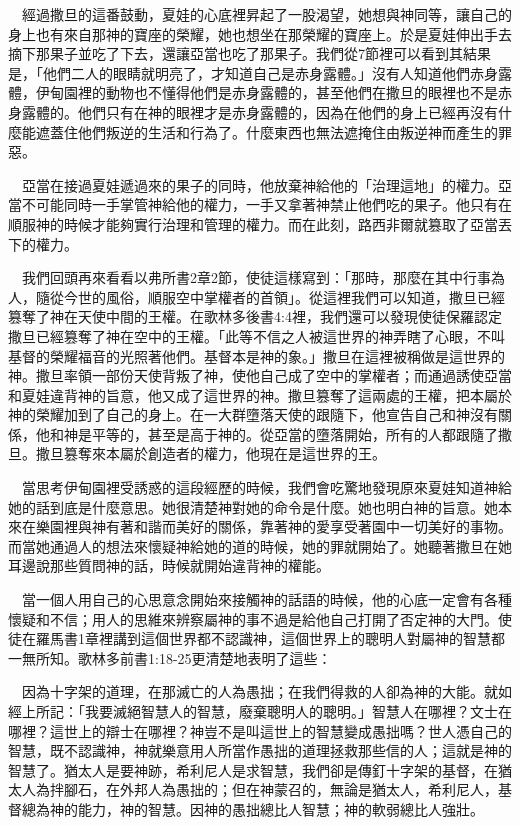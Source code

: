 \documentclass{book}
\begin{document}
　經過撒旦的這番鼓動，夏娃的心底裡昇起了一股渴望，她想與神同等，讓自己的身上也有來自那神的寶座的榮耀，她也想坐在那榮耀的寶座上。於是夏娃伸出手去摘下那果子並吃了下去，還讓亞當也吃了那果子。我們從7節裡可以看到其結果是，「他們二人的眼睛就明亮了，才知道自己是赤身露體。」沒有人知道他們赤身露體，伊甸園裡的動物也不懂得他們是赤身露體的，甚至他們在撒旦的眼裡也不是赤身露體的。他們只有在神的眼裡才是赤身露體的，因為在他們的身上已經再沒有什麼能遮蓋住他們叛逆的生活和行為了。什麼東西也無法遮掩住由叛逆神而產生的罪惡。

　亞當在接過夏娃遞過來的果子的同時，他放棄神給他的「治理這地」的權力。亞當不可能同時一手掌管神給他的權力，一手又拿著神禁止他們吃的果子。他只有在順服神的時候才能夠實行治理和管理的權力。而在此刻，路西非爾就篡取了亞當丟下的權力。

　我們回頭再來看看以弗所書2章2節，使徒這樣寫到：「那時，那麼在其中行事為人，隨從今世的風俗，順服空中掌權者的首領」。從這裡我們可以知道，撒旦已經篡奪了神在天使中間的王權。在歌林多後書4:4裡，我們還可以發現使徒保羅認定撒旦已經篡奪了神在空中的王權。「此等不信之人被這世界的神弄瞎了心眼，不叫基督的榮耀福音的光照著他們。基督本是神的象。」撒旦在這裡被稱做是這世界的神。撒旦率領一部份天使背叛了神，使他自己成了空中的掌權者；而通過誘使亞當和夏娃違背神的旨意，他又成了這世界的神。撒旦篡奪了這兩處的王權，把本屬於神的榮耀加到了自己的身上。在一大群墮落天使的跟隨下，他宣告自己和神沒有關係，他和神是平等的，甚至是高于神的。從亞當的墮落開始，所有的人都跟隨了撒旦。撒旦篡奪來本屬於創造者的權力，他現在是這世界的王。

　當思考伊甸園裡受誘惑的這段經歷的時候，我們會吃驚地發現原來夏娃知道神給她的話到底是什麼意思。她很清楚神對她的命令是什麼。她也明白神的旨意。她本來在樂園裡與神有著和諧而美好的關係，靠著神的愛享受著園中一切美好的事物。而當她通過人的想法來懷疑神給她的道的時候，她的罪就開始了。她聽著撒旦在她耳邊說那些質問神的話，時候就開始違背神的權能。

　當一個人用自己的心思意念開始來接觸神的話語的時候，他的心底一定會有各種懷疑和不信；用人的思維來辨察屬神的事不過是給他自己打開了否定神的大門。使徒在羅馬書1章裡講到這個世界都不認識神，這個世界上的聰明人對屬神的智慧都一無所知。歌林多前書1:18-25更清楚地表明了這些：

　因為十字架的道理，在那滅亡的人為愚拙；在我們得救的人卻為神的大能。就如經上所記：「我要滅絕智慧人的智慧，廢棄聰明人的聰明。」智慧人在哪裡？文士在哪裡？這世上的辯士在哪裡？神豈不是叫這世上的智慧變成愚拙嗎？世人憑自己的智慧，既不認識神，神就樂意用人所當作愚拙的道理拯救那些信的人；這就是神的智慧了。猶太人是要神跡，希利尼人是求智慧，我們卻是傳釘十字架的基督，在猶太人為拌腳石，在外邦人為愚拙的；但在神蒙召的，無論是猶太人，希利尼人，基督總為神的能力，神的智慧。因神的愚拙總比人智慧；神的軟弱總比人強壯。
\end{document}
